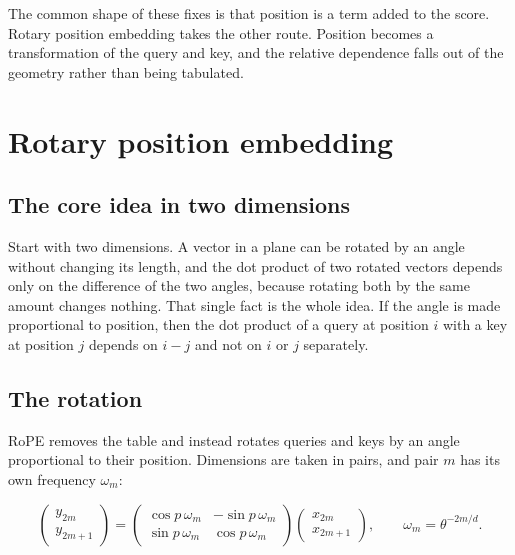 The common shape of these fixes is that position is a term added to the
score. Rotary position embedding takes the other route. Position becomes
a transformation of the query and key, and the relative dependence falls
out of the geometry rather than being tabulated.

\hypertarget{rotary-position-embedding}{%
\section{Rotary position embedding}\label{rotary-position-embedding}}

\hypertarget{the-core-idea-in-two-dimensions}{%
\subsection{The core idea in two
dimensions}\label{the-core-idea-in-two-dimensions}}

Start with two dimensions. A vector in a plane can be rotated by an
angle without changing its length, and the dot product of two rotated
vectors depends only on the difference of the two angles, because
rotating both by the same amount changes nothing. That single fact is
the whole idea. If the angle is made proportional to position, then the
dot product of a query at position \(i\) with a key at position \(j\)
depends on \(i - j\) and not on \(i\) or \(j\) separately.

\hypertarget{the-rotation}{%
\subsection{The rotation}\label{the-rotation}}

RoPE removes the table and instead rotates queries and keys by an angle
proportional to their position. Dimensions are taken in pairs, and pair
\(m\) has its own frequency \(\omega_m\):

\[
\begin{pmatrix} y_{2m} \\ y_{2m+1} \end{pmatrix} =
\begin{pmatrix} \cos p\,\omega_m & -\sin p\,\omega_m \\ \sin p\,\omega_m & \cos p\,\omega_m \end{pmatrix}
\begin{pmatrix} x_{2m} \\ x_{2m+1} \end{pmatrix},
\qquad
\omega_m = \theta^{-2m/d} .
\]

